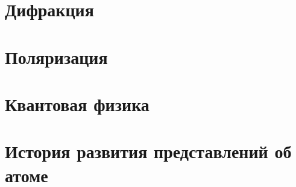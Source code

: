 \documentclass[11pt]{article}
\begin{document}
\begin{enumerate}
		\section{Дифракция}
		\section{Поляризация}
		\section{Квантовая физика}
		\section{История развития представлений об атоме}
	\end{enumerate}
\end{document}
